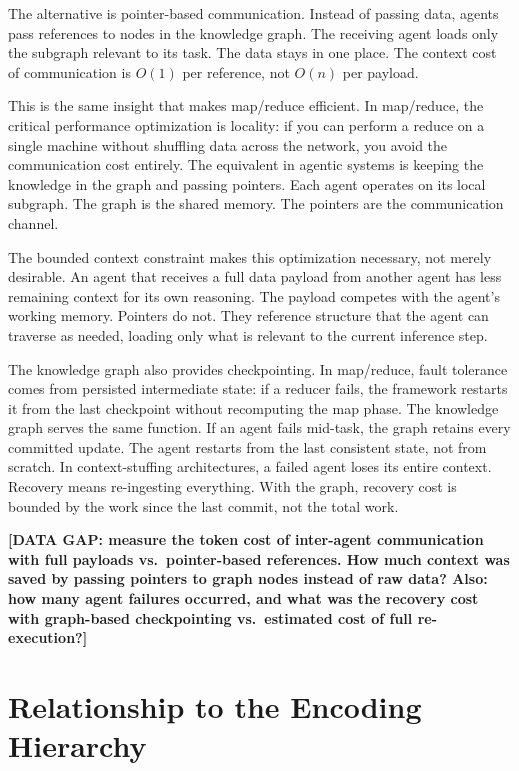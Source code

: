\documentclass[11pt]{article}
\theoremstyle{definition}
\begin{document}
The alternative is pointer-based communication. Instead of passing
data, agents pass references to nodes in the knowledge graph. The
receiving agent loads only the subgraph relevant to its task. The
data stays in one place. The context cost of communication is $O(1)$
per reference, not $O(n)$ per payload.

This is the same insight that makes map/reduce efficient. In
map/reduce, the critical performance optimization is locality: if you
can perform a reduce on a single machine without shuffling data across
the network, you avoid the communication cost entirely. The equivalent
in agentic systems is keeping the knowledge in the graph and passing
pointers. Each agent operates on its local subgraph. The graph is the
shared memory. The pointers are the communication channel.

The bounded context constraint makes this optimization necessary, not
merely desirable. An agent that receives a full data payload from
another agent has less remaining context for its own reasoning. The
payload competes with the agent's working memory. Pointers do not.
They reference structure that the agent can traverse as needed,
loading only what is relevant to the current inference step.

The knowledge graph also provides checkpointing. In map/reduce,
fault tolerance comes from persisted intermediate state: if a reducer
fails, the framework restarts it from the last checkpoint without
recomputing the map phase. The knowledge graph serves the same
function. If an agent fails mid-task, the graph retains every
committed update. The agent restarts from the last consistent state,
not from scratch. In context-stuffing architectures, a failed agent
loses its entire context. Recovery means re-ingesting everything.
With the graph, recovery cost is bounded by the work since the last
commit, not the total work.

\textbf{[DATA GAP: measure the token cost of inter-agent communication
with full payloads vs.\ pointer-based references. How much context was
saved by passing pointers to graph nodes instead of raw data? Also:
how many agent failures occurred, and what was the recovery cost with
graph-based checkpointing vs.\ estimated cost of full re-execution?]}

\section{Relationship to the Encoding Hierarchy}
\label{sec:encoding}
\end{document}
